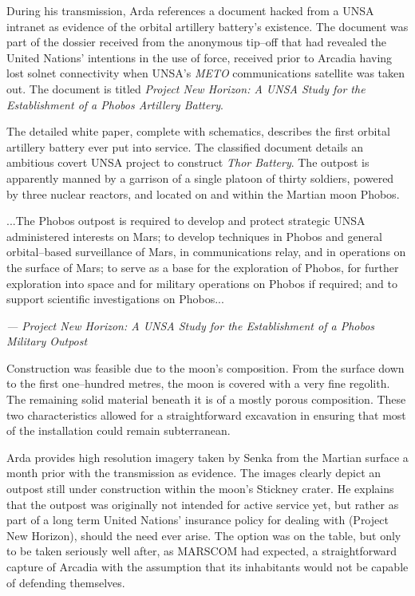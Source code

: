 During his transmission, Arda references a document hacked from a UNSA intranet as evidence of the orbital artillery battery's existence. The document was part of the dossier received from the anonymous tip--off that had revealed the United Nations' intentions in the use of force, received prior to Arcadia having lost solnet connectivity when UNSA's {\it METO} communications satellite was taken out. The document is titled {\it Project New Horizon: A UNSA Study for the Establishment of a Phobos Artillery Battery}.

The detailed white paper, complete with schematics, describes the first orbital artillery battery ever put into service. The classified document details an ambitious covert UNSA project to construct {\it Thor Battery}. The outpost is apparently manned by a garrison of a single platoon of thirty soldiers, powered by three nuclear reactors, and located on and within the Martian moon Phobos. 

\startTimelineGeneralDocument
...The Phobos outpost is required to develop and protect strategic UNSA administered interests on Mars; to develop techniques in Phobos and general orbital--based surveillance of Mars, in communications relay, and in operations on the surface of Mars; to serve as a base for the exploration of Phobos, for further exploration into space and for military operations on Phobos if required; and to support scientific investigations on Phobos...

\hskip 1.5cm {\it --- Project New Horizon: A UNSA Study for the Establishment of a Phobos Military Outpost}
\stopTimelineGeneralDocument

Construction was feasible due to the moon's composition. From the surface down to the first one--hundred metres, the moon is covered with a very fine regolith. The remaining solid material beneath it is of a mostly porous composition. These two characteristics allowed for a straightforward excavation in ensuring that most of the installation could remain subterranean.

Arda provides high resolution imagery taken by Senka from the Martian surface a month prior with the transmission as evidence. The images clearly depict an outpost still under construction within the moon's Stickney crater. He explains that the outpost was originally not intended for active service yet, but rather as part of a long term United Nations' insurance policy for dealing with  (Project New Horizon), should the need ever arise. The option was on the table, but only to be taken seriously well after, as MARSCOM had expected, a straightforward capture of Arcadia with the assumption that its inhabitants would not be capable of defending themselves.

